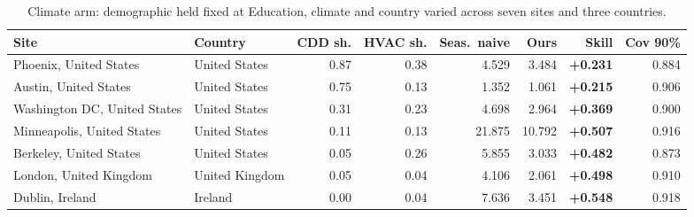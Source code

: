 \begin{table}[t]
\centering
\footnotesize
\setlength{\tabcolsep}{3.5pt}
\begin{tabular}{llrrrrrr}
\toprule
Site & Country & CDD sh. & HVAC sh. & Seas.\ naive & Ours & Skill & Cov 90\% \\
\midrule
Phoenix, United States & United States & 0.87 & 0.38 & 4.529 & 3.484 & \textbf{+0.231} & 0.884 \\
Austin, United States & United States & 0.75 & 0.13 & 1.352 & 1.061 & \textbf{+0.215} & 0.906 \\
Washington DC, United States & United States & 0.31 & 0.23 & 4.698 & 2.964 & \textbf{+0.369} & 0.900 \\
Minneapolis, United States & United States & 0.11 & 0.13 & 21.875 & 10.792 & \textbf{+0.507} & 0.916 \\
Berkeley, United States & United States & 0.05 & 0.26 & 5.855 & 3.033 & \textbf{+0.482} & 0.873 \\
London, United Kingdom & United Kingdom & 0.05 & 0.04 & 4.106 & 2.061 & \textbf{+0.498} & 0.910 \\
Dublin, Ireland & Ireland & 0.00 & 0.04 & 7.636 & 3.451 & \textbf{+0.548} & 0.918 \\
\bottomrule
\end{tabular}
\caption{Climate arm: demographic held fixed at Education, climate and country varied across seven sites and three countries.}
\label{tab:climate}
\end{table}
